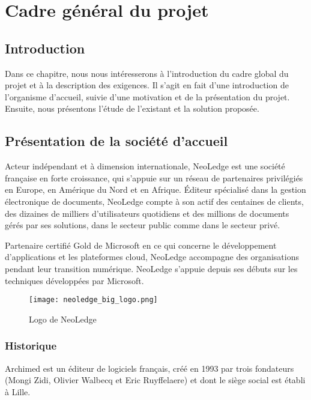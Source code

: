 
\chapter*{Cadre général du projet}
\label{chap:cadreGeneral}

\section*{Introduction}
Dans ce chapitre, nous nous intéresserons à l'introduction du cadre global du projet et à la description des exigences. Il s'agit en fait d'une introduction de l'organisme d'accueil, suivie d'une motivation et de la présentation du projet. Ensuite, nous présentons l'étude de l'existant et la solution proposée.

\section{Présentation de la société d'accueil}
Acteur indépendant et à dimension internationale, NeoLedge est une société française en forte croissance, qui s'appuie sur un réseau de partenaires privilégiés en Europe, en Amérique du Nord et en Afrique. Éditeur spécialisé dans la gestion électronique de documents, NeoLedge compte à son actif des centaines de clients, des dizaines de milliers d'utilisateurs quotidiens et des millions de documents gérés par ses solutions, dans le secteur public comme dans le secteur privé.

\medskip

Partenaire certifié Gold de Microsoft en ce qui concerne le développement d'applications et les plateformes cloud, NeoLedge accompagne des organisations 
pendant leur transition numérique.
NeoLedge s'appuie depuis ses débuts sur les techniques développées par Microsoft. 

\begin{figure}[!h]
\centering
\texttt{[image: neoledge\_big\_logo.png]}
\caption{Logo de NeoLedge}
\label{fig:logoNeoledge}
\end{figure}

\subsection{Historique}

Archimed est un éditeur de logiciels français, créé en 1993 par trois fondateurs (Mongi Zidi, Olivier Walbecq et Eric Ruyffelaere) et dont le siège social est établi à Lille.
\medskip

